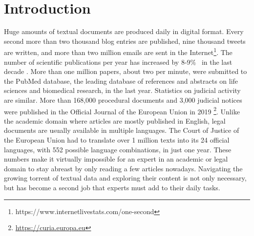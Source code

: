 

\chapter{Introduction}\label{ch:introduction}

\graphicspath{{introduction/figures/}}




Huge amounts of textual documents are produced daily in digital format. Every second more than two thousand blog entries are published, nine thousand tweets are written, and more than two million emails are sent in the Internet\footnote{https://www.internetlivestats.com/one-second}. The number of scientific publications per year has increased by 8-9\%~ in the last decade \citep{Ware2018STM}. More than one million papers, about two per minute,  were submitted to the PubMed database, the leading database of references and abstracts on life sciences and biomedical research, in the last year. Statistics on judicial activity are similar. More than 168,000 procedural documents and 3,000 judicial notices were published in the Official Journal of the European Union in 2019 \footnote{\url{https://curia.europa.eu}}. Unlike the academic domain where articles are mostly published in English, legal documents are usually available in multiple languages. The Court of Justice of the European Union had to translate over 1 million texts into its 24 official languages, with 552 possible language combinations, in just one year. These numbers make it virtually impossible for an expert in an academic or legal domain to stay abreast by only reading a few articles nowadays. Navigating the growing torrent of textual data and exploring their content is not only necessary, but has become a second job that experts must add to their daily tasks. 

